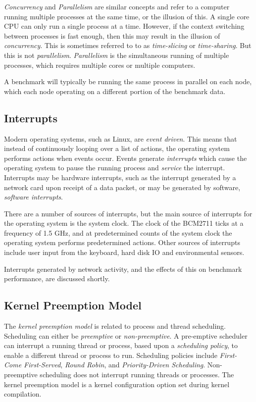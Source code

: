 \emph{Concurrency} and \emph{Parallelism} are similar concepts and refer to a computer running multiple processes at the same time, or the illusion of this. A single core CPU can only run a single process at a time. However, if the context switching between processes is fast enough, then this may result in the illusion of \emph{concurrency}. This is sometimes referred to to as \emph{time-slicing} or \emph{time-sharing}. But this is not \emph{parallelism}. \emph{Parallelism} is the simultaneous running of multiple processes, which requires multiple cores or multiple computers.

A benchmark will typically be running the same process in parallel on each node, which each node operating on a different portion of the benchmark data.


\subsection{Interrupts}

Modern operating systems, such as Linux, are \emph{event driven}. This means that instead of continuously looping over a list of actions, the operating system performs actions when events occur. Events generate \emph{interrupts} which cause the operating system to pause the running process and \emph{service} the interrupt. Interrupts may be hardware interrupts, such as the interrupt generated by a network card upon receipt of a data packet, or may be generated by software, \emph{software interrupts}.

There are a number of sources of interrupts, but the main source of interrupts for the operating system is the system clock. The clock of the BCM2711 ticks at a frequency of 1.5 GHz, and at predetermined counts of the system clock the operating system performs predetermined actions. Other sources of interrupts include user input from the keyboard, hard disk IO and environmental sensors.

Interrupts generated by network activity, and the effects of this on benchmark performance, are discussed shortly.


\subsection{Kernel Preemption Model}

The \emph{kernel preemption model} is related to process and thread scheduling. Scheduling can either be \emph{preemptive} or \emph{non-preemptive}. A pre-emptive scheduler can interrupt a running thread or process, based upon a \emph{scheduling policy}, to enable a different thread or process to run. Scheduling policies include \emph{First-Come First-Served}, \emph{Round Robin}, and \emph{Priority-Driven Scheduling}. Non-preemptive scheduling does not interrupt running threads or processes. The kernel preemption model is a kernel configuration option set during kernel compilation.

